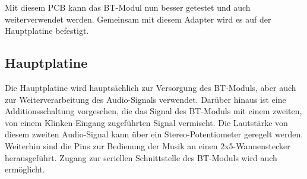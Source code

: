 Mit diesem PCB kann das BT-Modul nun besser getestet und auch weiterverwendet werden.
Gemeinsam mit diesem Adapter wird es auf der Hauptplatine befestigt.
\newpage


\subsection*{Hauptplatine} \label{subsec:5.3.8}
Die Hauptplatine wird hauptsächlich zur Versorgung des BT-Moduls, aber auch zur Weiterverarbeitung des Audio-Signals verwendet.
Darüber hinaus ist eine Additionsschaltung vorgesehen, die das Signal des BT-Moduls mit einem zweiten, von einem Klinken-Eingang zugeführten Signal vermischt.
Die Lautstärke von diesem zweiten Audio-Signal kann über ein Stereo-Potentiometer geregelt werden.
\\
Weiterhin sind die Pins zur Bedienung der Musik an einen 2x5-Wannenstecker herausgeführt.
Zugang zur seriellen Schnittstelle des BT-Moduls wird auch ermöglicht.
\\

